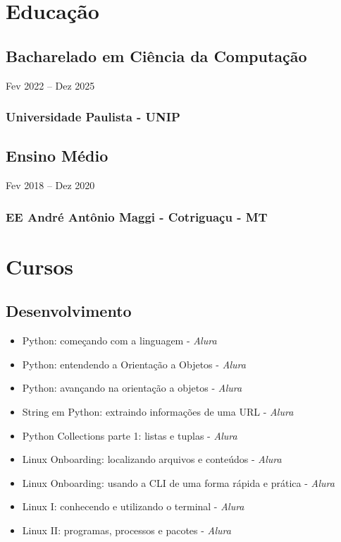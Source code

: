 \documentclass{cv}
\begin{document}
\section{Educação}

\subsection{Bacharelado em Ciência da Computação}
{Fev 2022 -- Dez 2025}
\subsubsection{Universidade Paulista - UNIP}

\subsection{Ensino Médio}
{Fev 2018 -- Dez 2020}
\subsubsection{EE André Antônio Maggi - Cotriguaçu - MT}

\section{Cursos}

\subsection{Desenvolvimento}{}

\begin{itemize}
  \item Python: começando com a linguagem - \textit{Alura}
  \item Python: entendendo a Orientação a Objetos - \textit{Alura}
  \item Python: avançando na orientação a objetos - \textit{Alura}
  \item String em Python: extraindo informações de uma URL - \textit{Alura}
  \item Python Collections parte 1: listas e tuplas - \textit{Alura}
  \item Linux Onboarding: localizando arquivos e conteúdos - \textit{Alura}
  \item Linux Onboarding: usando a CLI de uma forma rápida e prática - \textit{Alura}
  \item Linux I: conhecendo e utilizando o terminal - \textit{Alura}
  \item Linux II: programas, processos e pacotes - \textit{Alura}
\end{itemize}
\end{document}
